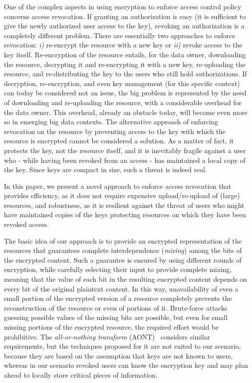 One of the complex aspects in using encryption to enforce access control policy concerns access revocation. If granting an authorization is easy (it is sufficient to give the newly authorized user access to the key), revoking an authorization is a completely different problem. There are essentially two approaches to enforce revocation: {\em i)\/} re-encrypt the resource with a new key or {\em ii)\/} revoke access to the key itself. Re-encryption of the resource entails, for the data owner, downloading the resource, decrypting it and re-encrypting it with a new key, re-uploading the resource, and re-distributing the key to the users who still hold authorizations. If decryption, re-encryption, and even key management (for this specific context) can today be considered not an issue, the big problem is represented by the need of downloading and re-uploading the resource, with a considerable overhead for the data owner. This overhead, already an obstacle today, will become even more so in emerging big data contexts. The alternative approach of enforcing revocation on the resource by preventing access to the key with which the resource is encrypted cannot be considered a solution. As a matter of fact, it protects the key, not the resource itself, and it is inevitably fragile against a user who - while having been revoked from an access - has maintained a local copy of the key. Since keys are compact in size, such a threat is indeed real.

\medskip
{}
In this paper, we present a novel approach to enforce access revocation that provides efficiency, as it does not require expensive upload/re-upload of (large) resources, and robustness, as it is resilient against the threat of users who might have maintained copies of the keys protecting resources on which they have been revoked access.

The basic idea of our approach is to provide an encrypted representation of the resources that guarantees complete interdependence ({\em mixing\/}) among the bits of the encrypted content. Such a guarantee is ensured by using different rounds of encryption, while carefully selecting their input to provide complete mixing, meaning that the value of each bit in the resulting encrypted content depends on every bit of the original plaintext content. In this way, unavailability of even a small portion of the encrypted version of a resource completely prevents the reconstruction of the resource or even of portions of it. Brute-force attacks guessing possible values of the missing bits are possible, but even for small missing portions of the encrypted resource, the required effort would be prohibitive.
The {\em all-or-nothing transform} (AONT)~\cite{r97} considers similar requirements, but the techniques proposed for it are not suited to our scenario, because they are based on the assumption that keys are not known to users, whereas in our scenario revoked users can know the encryption key and may plan ahead to locally store critical pieces of information.

